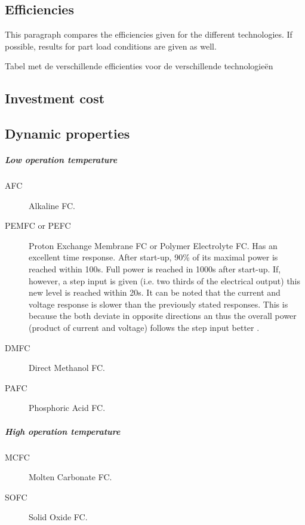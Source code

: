 \subsection{Efficiencies}
\cite{Hawkes2005}
This paragraph compares the efficiencies given for the different technologies. If possible, results for part load conditions are given as well.

Tabel met de verschillende efficienties voor de verschillende  technologieën
\subsection{Investment cost}
\subsection{Dynamic properties}
\subparagraph{Low operation temperature}
\begin{description}
  \item[AFC] Alkaline FC. 
  \item[PEMFC or PEFC] Proton Exchange Membrane FC or Polymer Electrolyte FC. Has an excellent time response. After start-up, 90\% of its maximal power is reached within 100s. Full power is reached in 1000s after start-up. If, however, a step input is given (i.e. two thirds of the electrical output) this new level is reached within 20s. It can be noted that the current and voltage response is slower than the previously stated responses. This is because the both deviate in opposite directions an thus the overall power (product of current and voltage) follows the step input better \cite{Barelli2012}.
  \item[DMFC] Direct Methanol FC. 
  \item[PAFC] Phosphoric Acid FC.
\end{description}
\subparagraph{High operation temperature}
\begin{description}
  \item[MCFC] Molten Carbonate FC.
  \item[SOFC] Solid Oxide FC.
\end{description}

